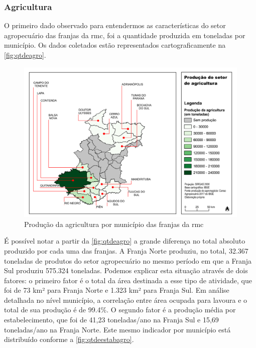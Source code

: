 	\subsubsection{Agricultura}
	
	O primeiro dado observado para entendermos as características do setor agropecuário das franjas da \glsdesc{rmc}, foi a quantidade produzida em toneladas por município. Os dados coletados estão representados cartograficamente na \autoref{fig:qtdeagro}.
	
	\begin{landscape}
		\begin{figure}
			\centering
			\caption{Produção da agricultura por município das franjas da \gls{rmc}}
			\label{fig:qtdeagro}
			\includegraphics[width=0.85\linewidth]{../gis/produtos/RMC_censorural_QTDE_PRODUZIDA_AGRO}
		\end{figure}
	\end{landscape}
	
	É possível notar a partir da \autoref{fig:qtdeagro} a grande diferença no total absoluto produzido por cada uma das franjas. A Franja Norte produziu, no total, 32.367 toneladas de produtos do setor agropecuário no mesmo período em que a Franja Sul produziu 575.324 toneladas. Podemos explicar esta situação através de dois fatores: o primeiro fator é o total da área destinada a esse tipo de atividade, que foi de 73 km² para Franja Norte e 1.323 km² para Franja Sul. Em análise detalhada no nível município, a correlação entre área ocupada para lavoura e o total de sua produção é de 99.4\%. O segundo fator é a produção média por estabelecimento, que foi de 41,23 toneladas/ano na Franja Sul e 15,69 toneladas/ano na Franja Norte. Este mesmo indicador por município está distribuído conforme a \autoref{fig:qtdeestabagro}.
	
